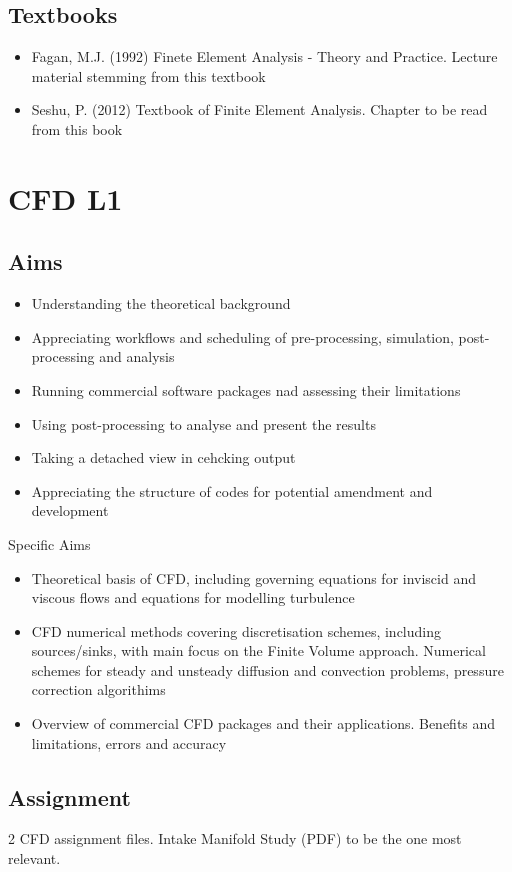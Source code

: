\documentclass[class=report, crop=false, 12pt,a4paper]{standalone}
\begin{document}
\subsection{Textbooks}
\begin{itemize}
	\item Fagan, M.J. (1992) Finete Element Analysis - Theory and Practice. Lecture material stemming from this textbook
	\item Seshu, P. (2012) Textbook of Finite Element Analysis. Chapter to be read from this book
\end{itemize}
\section{CFD L1}
\subsection{Aims}
\begin{itemize}
	\item Understanding the theoretical background
	\item Appreciating workflows and scheduling of pre-processing, simulation, post-processing and analysis
	\item Running commercial software packages nad assessing their limitations
	\item Using post-processing to analyse and present the results
	\item Taking a detached view in cehcking output
	\item Appreciating the structure of codes for potential amendment and development
\end{itemize}
Specific Aims
\begin{itemize}
	\item Theoretical basis of CFD, including governing equations for inviscid and viscous flows and equations for modelling turbulence
	\item CFD numerical methods covering discretisation schemes, including sources/sinks, with main focus on the Finite Volume approach. Numerical schemes for steady and unsteady diffusion and convection problems, pressure correction algorithims
	\item Overview of commercial CFD packages and their applications. Benefits and limitations, errors and accuracy
\end{itemize}
\subsection{Assignment}
2 CFD assignment files. Intake Manifold Study (PDF) to be the one most relevant.
\end{document}
